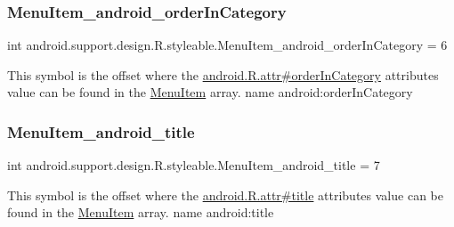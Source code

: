 \subsubsection{\texorpdfstring{Menu\+Item\+\_\+android\+\_\+order\+In\+Category}{MenuItem\_android\_orderInCategory}}
{\footnotesize\ttfamily int android.\+support.\+design.\+R.\+styleable.\+Menu\+Item\+\_\+android\+\_\+order\+In\+Category = 6\hspace{0.3cm}{\ttfamily [static]}}

This symbol is the offset where the \hyperlink{}{android.\+R.\+attr\#order\+In\+Category} attribute\textquotesingle{}s value can be found in the \hyperlink{classandroid_1_1support_1_1design_1_1R_1_1styleable_a4c90afdbb461f2bfba191da26fbc881c}{Menu\+Item} array.  name android\+:order\+In\+Category \mbox{\label{classandroid_1_1support_1_1design_1_1R_1_1styleable_a763cbf62cbe6f3aa61ca4b0a2ba68494}} 
\subsubsection{\texorpdfstring{Menu\+Item\+\_\+android\+\_\+title}{MenuItem\_android\_title}}
{\footnotesize\ttfamily int android.\+support.\+design.\+R.\+styleable.\+Menu\+Item\+\_\+android\+\_\+title = 7\hspace{0.3cm}{\ttfamily [static]}}

This symbol is the offset where the \hyperlink{}{android.\+R.\+attr\#title} attribute\textquotesingle{}s value can be found in the \hyperlink{classandroid_1_1support_1_1design_1_1R_1_1styleable_a4c90afdbb461f2bfba191da26fbc881c}{Menu\+Item} array.  name android\+:title \mbox{\label{classandroid_1_1support_1_1design_1_1R_1_1styleable_aa151f315fb220476a341678d66a423be}} 
